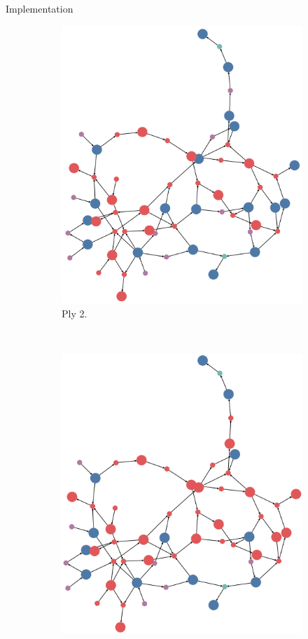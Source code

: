\documentclass[final]{beamer} %
\begin{document}
\begin{columns}
\begin{column}{.35\textwidth}
\begin{block}{Implementation}
\begin{figure}[!htb]
\begin{subfigure}[!htb]{0.18\columnwidth}
				\includegraphics[width=\columnwidth]{figures/knn_forward_think_2.png}
				\caption{Ply 2.}
			\end{subfigure}
			~
			\begin{subfigure}[!htb]{0.18\columnwidth}
				\centering
				\includegraphics[width=\columnwidth]{figures/knn_forward_think_3.png}

\end{subfigure}
\end{figure}
\end{block}
\end{column}
\end{columns}
\end{document}
